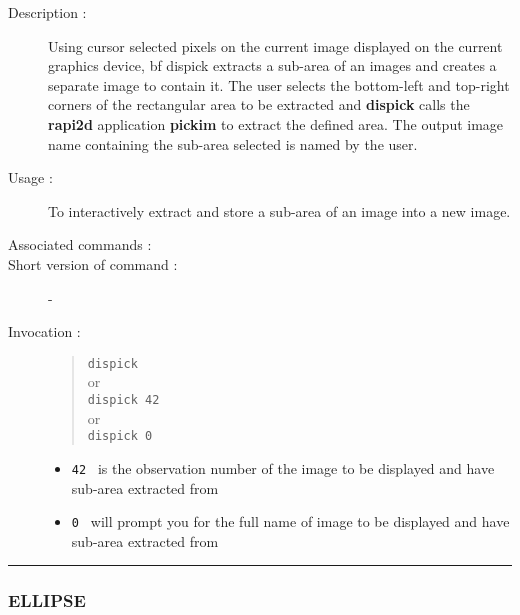 \begin{description}

\item[Description :] Using cursor selected pixels on the current image
displayed on the current graphics device, {bf dispick} extracts a sub-area
of an images and creates a separate image to contain it.  The user
selects the bottom-left and top-right corners of the rectangular area
to be extracted and {\bf dispick} calls the {\bf rapi2d} application
{\bf pickim} to extract the defined area.  The output image name
containing the sub-area selected is named by the user.

\item[Usage :] To interactively extract and store a sub-area of an image
into a new image.
\item[Associated commands :] {\tt {}}
\item[Short version of command :] -
\item[Invocation :]

\begin{quote}{\tt  dispick }\\
or \\
{\tt dispick 42 }\\
or \\
{\tt dispick 0 }
\end{quote}

\begin{itemize}
\item {\tt 42 } is the observation number of the image to be displayed
and have sub-area extracted from
\item {\tt 0 } will prompt you for the full name of image to be displayed
and have sub-area extracted from
\end{itemize}

\end{description}

\hrule 
\subsubsection*{\label{ELLIPSE}ELLIPSE}

